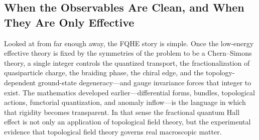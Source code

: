 \subsection{When the Observables Are Clean, and When They Are Only Effective}
\label{subsec:qhe-caveats}

%

\medskip

Looked at from far enough away, the FQHE story is simple. Once the low-energy effective theory is fixed by the symmetries of the problem to be a Chern--Simons theory, a single integer controls the quantized transport, the fractionalization of quasiparticle charge, the braiding phase, the chiral edge, and the topology-dependent ground-state degeneracy---and gauge invariance forces that integer to exist. The mathematics developed earlier---differential forms, bundles, topological actions, functorial quantization, and anomaly inflow---is the language in which that rigidity becomes transparent. In that sense the fractional quantum Hall effect is not only an application of topological field theory, but the experimental evidence that topological field theory governs real macroscopic matter.
